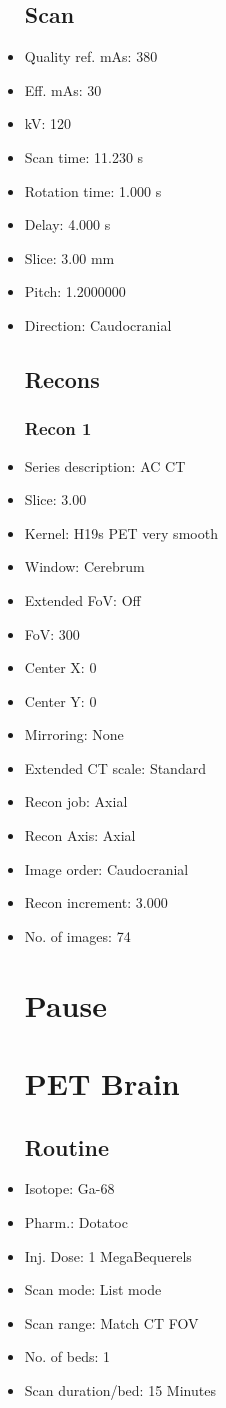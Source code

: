 \documentclass[12pt]{article}
\begin{document}
\begin{itemize}
\subsection{Scan}
\item Quality ref. mAs: 380\item Eff. mAs: 30\item kV: 120\item Scan time: 11.230 s\item Rotation time: 1.000 s\item Delay: 4.000 s\item Slice: 3.00 mm\item Pitch: 1.2000000\item Direction: Caudocranial\subsection{Recons}

\subsubsection{Recon 1}
\item Series description: AC CT
\item Slice: 3.00
\item Kernel: H19s PET very smooth
\item Window: Cerebrum
\item Extended FoV: Off
\item FoV: 300
\item Center X: 0
\item Center Y: 0
\item Mirroring: None
\item Extended CT scale: Standard
\item Recon job: Axial
\item Recon Axis: Axial
\item Image order: Caudocranial
\item Recon increment: 3.000
\item No. of images: 74
\section{Pause}
\section{PET Brain}\subsection{Routine}
\item Isotope: Ga-68
\item Pharm.: Dotatoc
\item Inj. Dose: 1 MegaBequerels
\item Scan mode: List mode
\item Scan range: Match CT FOV
\item No. of beds: 1
\item Scan duration/bed: 15 Minutes

\end{itemize}
\end{document}

